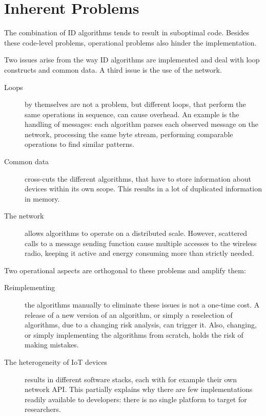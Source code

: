 \documentclass[3p,times,procedia]{elsarticle}
\begin{document}
\section{Inherent Problems}
\label{problems}

The combination of ID algorithms tends to result in suboptimal code. Besides
these code-level problems, operational problems also hinder the implementation.

Two issues arise from the way ID algorithms are implemented and deal with loop
constructs and common data. A third issue is the use of the network.

\begin{description}

  \item[Loops] by themselves are not a problem, but different loops, that
  perform the same operations in sequence, can cause overhead. An example is
  the handling of messages: each algorithm parses each observed message on the
  network, processing the same byte stream, performing comparable operations to
  find similar patterns.

  \item[Common data] cross-cuts the different algorithms, that have to store
  information about devices within its own scope. This results in a lot of
  duplicated information in memory.

  \item[The network] allows algorithms to operate on a distributed scale.
  However, scattered calls to a message sending function cause multiple
  accesses to the wireless radio, keeping it active and energy consuming more
  than strictly needed.

\end{description}

Two operational aspects are orthogonal to these problems and amplify them:

\begin{description}
  
  \item[Reimplementing] the algorithms manually to eliminate these issues is
  not a one-time cost. A release of a new version of an algorithm, or simply a
  reselection of algorithms, due to a changing risk analysis, can trigger it.
  Also, changing, or simply implementing the algorithms from scratch, holds the
  risk of making mistakes.

  \item[The heterogeneity of IoT devices] results in different software stacks,
  each with for example their own network API\@. This partially explains why
  there are few implementations readily available to developers: there is no
  single platform to target for researchers.

\end{description}
\end{document}
